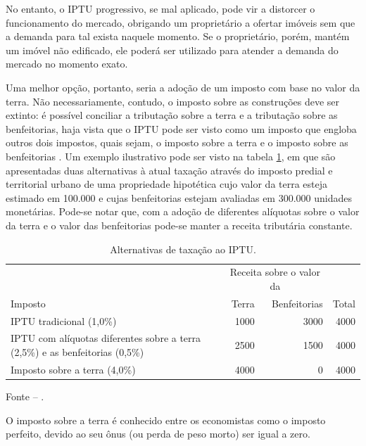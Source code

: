 \documentclass[
	12pt,				%
	oneside,			%
	a4paper,			%
	chapter=TITLE,		%
	section=TITLE,		%
	english,			%
	brazil				%
	]{abntex2}
\newcommand{\bcenter}{\begin{center}}
\newcommand{\ecenter}{\end{center}}
\begin{document}
\begin{refsection}
No entanto, o \gls{IPTU} progressivo, se mal aplicado, pode vir a distorcer o
funcionamento do mercado, obrigando um proprietário a ofertar imóveis sem que a
demanda para tal exista naquele momento. Se o proprietário, porém, mantém um
imóvel não edificado, ele poderá ser utilizado para atender a demanda do mercado
no momento exato.

Uma melhor opção, portanto, seria a adoção de um imposto com base no valor da
terra. Não necessariamente, contudo, o imposto sobre as construções deve ser
extinto: é possível conciliar a tributação sobre a terra e a tributação sobre as
benfeitorias, haja vista que o \gls{IPTU} pode ser visto como um imposto que
engloba outros dois impostos, quais sejam, o imposto sobre a terra e o imposto
sobre as benfeitorias \autocite[p.6]{landtheory}. Um exemplo ilustrativo pode ser visto
na tabela \ref{tab:altIPTU}, em que são apresentadas duas alternativas à atual
taxação através do imposto predial e territorial urbano de uma propriedade
hipotética cujo valor da terra esteja estimado em 100.000
e cujas benfeitorias estejam avaliadas em 300.000 unidades monetárias. Pode-se
notar que, com a adoção de diferentes alíquotas sobre o valor
da terra e o valor das benfeitorias pode-se manter a
receita tributária constante.
\begin{table}[H]

\caption{\label{tab:altIPTU}Alternativas de taxação ao IPTU.}
\centering
\begin{tabular}[t]{>{\raggedright\arraybackslash}p{8cm}rrr}
\toprule
\multicolumn{1}{c}{ } & \multicolumn{2}{c}{Receita sobre o valor da} & \multicolumn{1}{c}{ } \\
\cmidrule(l{3pt}r{3pt}){2-3}
Imposto & Terra & Benfeitorias & Total\\
\midrule
IPTU tradicional (1,0\%) & 1000 & 3000 & 4000\\
IPTU com alíquotas diferentes sobre a
                             terra (2,5\%) e as benfeitorias (0,5\%) & 2500 & 1500 & 4000\\
Imposto sobre a terra (4,0\%) & 4000 & 0 & 4000\\
\bottomrule
\end{tabular}
\end{table}
\bcenter

Fonte -- \textcite[p.~6]{landtheory}.
\ecenter

O imposto sobre a terra é conhecido entre os
economistas como o imposto perfeito, devido ao seu ônus (ou perda de peso morto)
ser igual a zero.


\end{refsection}
\end{document}
